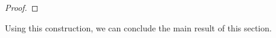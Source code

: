 \documentclass[runningheads,UKenglish,cleveref, autoref, thm-restate]{llncs}
\DeclareMathOperator\ScatFact{SubSeq}
\DeclareMathOperator{\nextAlphPos}{next}
\begin{document}
\begin{proof}
\end{proof}
\fi

Using this construction, we can conclude the main result of this section.
\end{document}

